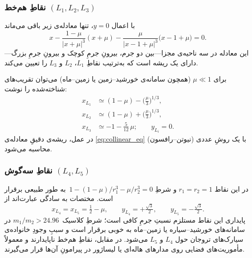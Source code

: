 


\subsubsection{نقاطِ هم‌خط \texorpdfstring{$(L_{1},L_{2},L_{3})$}{(L1,L2,L3)}}\label{subsec:collinear}

با اعمال $y=0$، تنها معادله‌ی زیر باقی می‌ماند
\begin{equation}\label{eq:collinear_eq}
	x-\frac{1-\mu}{|x+\mu|^{3}}(x+\mu)-\frac{\mu}{|x-1+\mu|^{3}}\bigl(x-1+\mu\bigr)=0.
\end{equation}
این معادله در سه ناحیه‌ی مجزا—بین دو جرم، بیرونِ جرمِ کوچک و بیرونِ جرمِ بزرگ—دارای یک ریشه است که به‌ترتیب نقاطِ $L_{1}$، $L_{2}$ و $L_{3}$ را تعیین می‌کند.

برای $\mu\ll1$ (همچون سامانه‌ی خورشید–زمین یا زمین–ماه) می‌توان تقریب‌های شناخته‌شده را نوشت:
\begin{align*}
	x_{L_{1}} &\simeq (1-\mu)-\bigl(\tfrac{\mu}{3}\bigr)^{1/3},\\
	x_{L_{2}} &\simeq (1-\mu)+\bigl(\tfrac{\mu}{3}\bigr)^{1/3},\\
	x_{L_{3}} &\simeq -1-\tfrac{5}{12}\,\mu; \qquad y_{L_{i}}=0.
\end{align*}
در عمل، ریشه‌ی دقیقِ معادله‌ی \eqref{eq:collinear_eq} با یک روشِ عددی (نیوتن–رافسون) محاسبه می‌شود.

\subsubsection{نقاطِ سه‌گوش \texorpdfstring{$(L_{4},L_{5})$}{(L4,L5)}}\label{subsec:triangular}

در این نقاط $r_{1}=r_{2}=1$ و شرطِ
\(1-(1-\mu)/r_{1}^{3}-\mu/r_{2}^{3}=0\)\, به طور طبیعی برقرار است. مختصات به سادگی عبارت‌اند از
\begin{equation}
	x_{L_{4}}=x_{L_{5}}=\tfrac12-\mu,\qquad
	y_{L_{4}}=+\tfrac{\sqrt3}{2},\qquad
	y_{L_{5}}=-\tfrac{\sqrt3}{2}.
\end{equation}
پایداری این نقاط مستلزم نسبتِ جرمِ کافی است؛ شرطِ کلاسیک~$m_{1}/m_{2}>24.96$ در سامانه‌های خورشید–سیاره یا زمین–ماه به خوبی برقرار است و سببِ وجودِ خانواده‌ی سیارک‌های تروجان حول $L_{4}$ و $L_{5}$ می‌شود. در مقابل، نقاطِ هم‌خط ناپایدارند و معمولاً مأموریت‌های فضایی روی مدارهای هاله‌ای یا لیساژور در پیرامونِ آن‌ها قرار می‌گیرند.


